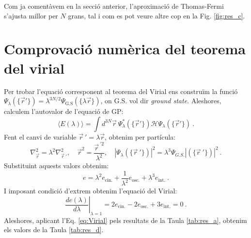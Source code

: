 \documentclass[a4paper]{article}
\begin{document}
Com ja comentàvem en la secció anterior, l'aproximació de Thomas-Fermi s'ajusta millor per $N$ grans, tal i com es pot veure altre cop en la Fig. \ref{fig:res_c}.




\section{\bf Comprovació numèrica del teorema del virial}


Per trobar l'equació corresponent al teorema del Virial ens construïm la funció $\Psi_{\lambda}(\{\vec r'\})=\lambda^{3N/2}\Psi_{\text{G.S}}(\{\lambda\vec r\})$, on G.S. vol dir \textit{ground state}. Aleshores, calculem l'autovalor de l'equació de GP:
\begin{equation}
   \langle E(\lambda)\rangle=\int d^{3N}\vec r \ \Psi_{\lambda}^{*}(\{\vec r'\})\mathcal{H} \Psi_{\lambda}(\{\vec r'\}) \ .
\end{equation}
Fent el canvi de variable $\vec r\ '= \lambda\vec r$, obtenim per partícula: 
\begin{equation}
    \nabla^2_{\vec r}=\lambda^2\nabla^2_{\vec r\ '}, \quad \vec r^2=\dfrac{{\vec r}^{\ '2}}{\lambda^2}, \quad |\Psi_{\lambda}(\{\vec r\ '\})|^2=\lambda^3\Psi_{G.S.}|(\{\vec r\ '\})|^2 \ .
\end{equation}
Substituint aquests valors obtenim:
\begin{equation}
    e= \lambda^2 e_{\text{cin.}}+\dfrac{1}{\lambda^2}e_{\text{osc.}}+\lambda^3 e_{\text{int.}}\ .
\end{equation}
I imposant condició d'extrem obtenim l'equació del Virial:
\begin{equation}
    \left.\dfrac{de(\lambda)}{d\lambda}\right\vert_{\lambda=1}=2e_{\text{cin.}}-2e_{\text{osc.}}+3 e_{\text{int.}}=0\ .
    \label{eq:Virial}
\end{equation}
Aleshores, aplicant l'Eq. \ref{eq:Virial} pels resultats de la Taula \ref{tab:res_a}, obtenim els valors de la Taula \ref{tab:res_d}.
\end{document}
